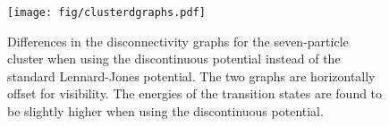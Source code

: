 \documentclass[aps,prl]{revtex4}
\begin{document}
\begin{figure}[htb]
  \texttt{[image: fig/clusterdgraphs.pdf]}
  \caption{\label{fig:clusterdgraphs}
    Differences in the disconnectivity graphs for the seven-particle cluster when using the discontinuous potential instead of the standard Lennard-Jones potential. The two graphs are horizontally offset for visibility. The energies of the transition states are found to be slightly higher when using the discontinuous potential.
  }
\end{figure}
\end{document}
